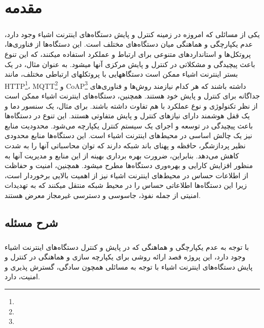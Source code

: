 
\chapter{مقدمه} \label{ch:intro}
\thispagestyle{empty}
\paragraph{}
{
    یکی از مسائلی که امروزه در زمینه کنترل و پایش دستگاه‌های اینترنت اشیاء وجود دارد، عدم یکپارچگی و هماهنگی
    میان دستگاه‌های مختلف است. این دستگاه‌ها از فناوری‌ها، پروتکل‌ها و استانداردهای متنوعی برای ارتباط و عملکرد
    استفاده میکنند، که این تنوع باعث پیچیدگی و مشکلاتی در کنترل و پایش مرکزی آنها میشود. به عنوان مثال، در یک
    بستر اینترنت اشیاء ممکن است دستگاههایی با پروتکلهای ارتباطی مختلف، مانند
    HTTP\footnote{}،
    MQTT\footnote{}
    و CoAP\footnote{}
    داشته باشند که هر کدام نیازمند روش‌ها و فناوری‌های جداگانه برای کنترل و پایش خود هستند. همچنین، دستگاه‌های
    اینترنت اشیاء ممکن است از نظر تکنولوژی و نوع عملکرد با هم تفاوت داشته باشند. برای مثال، یک سنسور دما و یک قفل هوشمند
    دارای نیازهای کنترل و پایش متفاوتی هستند. این تنوع در دستگاه‌ها باعث پیچیدگی در توسعه و اجرای یک سیستم
    کنترل یکپارچه می‌شود.
    محدودیت منابع نیز یک چالش اساسی در محیط‌های اینترنت اشیاء است. این دستگاه‌ها منابع محدودی نظیر پردازشگر،
    حافظه و پهنای باند شبکه دارند که توان محاسباتی آنها را به شدت کاهش می‌دهد. بنابراین، ضرورت بهره برداری بهینه
    از این منابع و مدیریت آنها به منظور افزایش کارایی و بهره‌وری دستگاه‌ها مطرح میشود. همچنین، امنیت و حفاظت از
    اطلاعات حساس در محیط‌های اینترنت اشیاء نیز از اهمیت بالایی برخوردار است، زیرا این دستگاه‌ها اطلاعاتی حساس
    را در محیط شبکه منتقل میکنند که به تهدیدات امنیتی از جمله نفوذ، جاسوسی و دسترسی غیرمجاز معرض هستند.
}

\section{شرح مسئله} \label{sec:sharh}
\paragraph{}
{
    با توجه به عدم یکپارچگی و هماهنگی که در پایش و کنترل دستگاه‌های اینترنت اشیاء وجود دارد،
    این پروژه قصد ارائه روشی برای یکپارچه سازی و هماهنگی در کنترل و پایش دستگاه‌های اینترنت اشیاء با توجه به مسائلی همچون
    سادگی، گسترش پذیری و امنیت، دارد.
}

